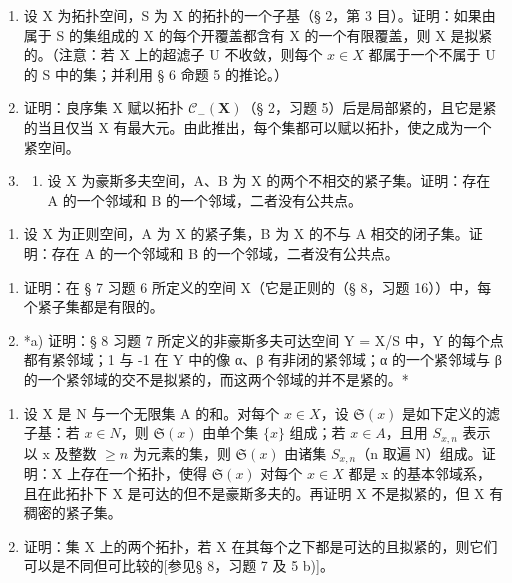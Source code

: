 \BourbakiExerciseGroup

\begin{enumerate}
\def\labelenumi{\arabic{enumi})}
\item
  设 X 为拓扑空间，S 为 X 的拓扑的一个子基（§ 2，第 3 目）。证明：如果由属于 S 的集组成的 X 的每个开覆盖都含有 X 的一个有限覆盖，则 X 是拟紧的。（注意：若 X 上的超滤子 U 不收敛，则每个 \(x \in X\) 都属于一个不属于 U 的 S 中的集；并利用 § 6 命题 5 的推论。）
\item
  证明：良序集 X 赋以拓扑 \(\mathcal{C}_{-}(\mathbf{X})\)（§ 2，习题 5）后是局部紧的，且它是紧的当且仅当 X 有最大元。由此推出，每个集都可以赋以拓扑，使之成为一个紧空间。
\item
  \begin{enumerate}
  \def\labelenumii{\alph{enumii})}
  \tightlist
  \item
    设 X 为豪斯多夫空间，A、B 为 X 的两个不相交的紧子集。证明：存在 A 的一个邻域和 B 的一个邻域，二者没有公共点。
  \end{enumerate}
\end{enumerate}

\begin{enumerate}
\def\labelenumi{\alph{enumi})}
\setcounter{enumi}{1}
\tightlist
\item
  设 X 为正则空间，A 为 X 的紧子集，B 为 X 的不与 A 相交的闭子集。证明：存在 A 的一个邻域和 B 的一个邻域，二者没有公共点。
\end{enumerate}

\begin{enumerate}
\def\labelenumi{\arabic{enumi})}
\setcounter{enumi}{3}
\item
  证明：在 § 7 习题 6 所定义的空间 X（它是正则的（§ 8，习题 16））中，每个紧子集都是有限的。
\item
  *a) 证明：§ 8 习题 7 所定义的非豪斯多夫可达空间 Y = X/S 中，Y 的每个点都有紧邻域；1 与 -1 在 Y 中的像 α、β 有非闭的紧邻域；α 的一个紧邻域与 β 的一个紧邻域的交不是拟紧的，而这两个邻域的并不是紧的。*
\end{enumerate}

\begin{enumerate}
\def\labelenumi{\alph{enumi})}
\setcounter{enumi}{1}
\item
  设 X 是 N 与一个无限集 A 的和。对每个 \(x \in X\)，设 \(\mathfrak{S}(x)\) 是如下定义的滤子基：若 \(x \in N\)，则 \(\mathfrak{S}(x)\) 由单个集 \(\{x\}\) 组成；若 \(x \in A\)，且用 \(S_{x,n}\) 表示以 x 及整数 \(\geqslant n\) 为元素的集，则 \(\mathfrak{S}(x)\) 由诸集 \(S_{x,n}\)（n 取遍 N）组成。证明：X 上存在一个拓扑，使得 \(\mathfrak{S}(x)\) 对每个 \(x \in X\) 都是 x 的基本邻域系，且在此拓扑下 X 是可达的但不是豪斯多夫的。再证明 X 不是拟紧的，但 X 有稠密的紧子集。
\item
  证明：集 X 上的两个拓扑，若 X 在其每个之下都是可达的且拟紧的，则它们可以是不同但可比较的{[}参见§ 8，习题 7 及 5 b){]}。
\end{enumerate}

